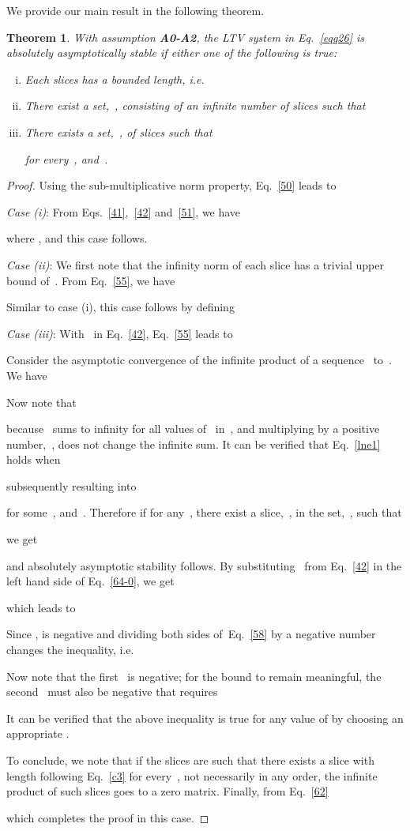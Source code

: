 \documentclass[draftclsnofoot, onecolumn, 12pt]{IEEEtran}
\newtheorem{thm}{Theorem}
\begin{document}
We provide our main result in the following theorem.
\begin{thm}\label{thm0}
With assumption {\bf{A0-A2}}, the LTV system in Eq.~\eqref{eqq26} is absolutely asymptotically stable if either one of the following is true:
\begin{enumerate}[(i)]
\item Each slices has a bounded length, i.e.


\item There exist a set,~, consisting of an infinite number of slices such that 


\item There exists a set,~, of slices such that

for every~, and~.
\end{enumerate}
\end{thm}
\begin{proof}
Using the sub-multiplicative norm property, Eq.~\eqref{50} leads to


\emph{Case (i)}: From Eqs.~\eqref{41},~\eqref{42} and~\eqref{51}, we have

where , and this case follows. 

\textit{Case (ii)}: We first note that the infinity norm of each slice has a trivial upper bound of~. From Eq.~\eqref{55}, we have

Similar to case (i), this case follows by defining


\textit{Case (iii)}: With~ in Eq.~\eqref{42}, Eq.~\eqref{55} leads to

Consider the asymptotic convergence of the infinite product of a sequence~ to~. We have

Now note that

because~ sums to infinity for all values of~ in~, and multiplying by a positive number,~, does not change the infinite sum. It can be verified that Eq.~\eqref{lne1} holds when 

subsequently resulting into 

for some~, and~.
Therefore if for any~, there exist a slice,~, in the set,~, such that

we get

and absolutely asymptotic stability follows. By substituting~ from Eq.~\eqref{42} in the left hand side of Eq.~\eqref{64-0}, we get

which leads to 

Since ,  is negative and dividing both sides of~Eq.~\eqref{58} by a negative number changes the inequality, i.e.

Now note that the first~ is negative; for the bound to remain meaningful, the second~ must also be negative that requires 

It can be verified that the above inequality is true for any value of  by choosing an appropriate . 

To conclude, we note that if the slices are such that there exists a slice with length following Eq.~\eqref{c3} for every~, not necessarily in any order, the infinite product of such slices goes to a zero matrix. Finally, from Eq.~\eqref{62}

which completes the proof in this case.
\end{proof}
\end{document}
